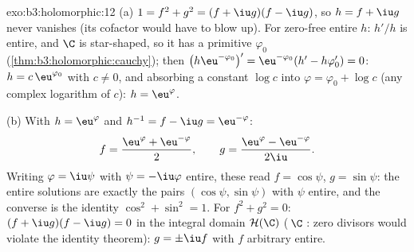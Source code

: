 \begin{solution}{exo:b3:holomorphic:12}
(a) $1 = f^2 + g^2 = (f + \iu g)(f - \iu g)$, so $h = f +
\iu g$ never vanishes (its cofactor would have to blow up).
For zero-free entire $h$: $h'/h$ is entire, and $\C$ is
star-shaped, so it has a primitive $\varphi_0$
(\cref{thm:b3:holomorphic:cauchy}); then
$\bigl(h\eu^{-\varphi_0}\bigr)' = \eu^{-\varphi_0}(h' -
h\varphi_0') = 0$: $h = c\,\eu^{\varphi_0}$ with $c \neq 0$,
and absorbing a constant $\log c$ into $\varphi = \varphi_0
+ \log c$ (any complex logarithm of $c$): $h =
\eu^{\varphi}$.

(b) With $h = \eu^{\varphi}$ and $h^{-1} = f - \iu g =
\eu^{-\varphi}$:
\[
f = \frac{\eu^{\varphi} + \eu^{-\varphi}}2,
\qquad
g = \frac{\eu^{\varphi} - \eu^{-\varphi}}{2\iu} .
\]
Writing $\varphi = \iu\psi$ with $\psi = -\iu\varphi$
entire, these read $f = \cos\psi$, $g = \sin\psi$: the
entire solutions are exactly the pairs $(\cos\psi,
\sin\psi)$ with $\psi$ entire, and the converse is the
identity $\cos^2 + \sin^2 = 1$.
For $f^2 + g^2 = 0$: $(f + \iu g)(f - \iu g) = 0$ in the
integral domain $\mathcal H(\C)$ (\,$\C$ : zero
divisors would violate the identity theorem): $g = \pm\iu
f$ with $f$ arbitrary entire.
\end{solution}

